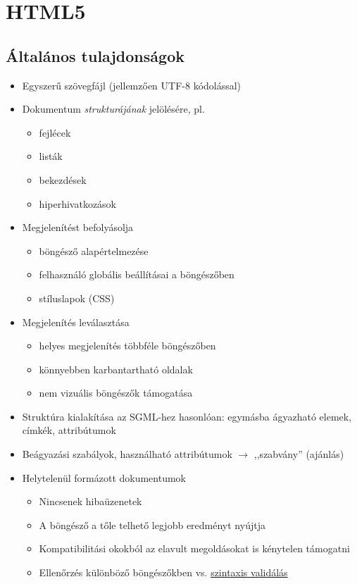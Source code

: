 \documentclass[usenames,dvipsnames,aspectratio=169]{beamer}
\newcommand{\hiv}[1]{{\color{hivatkozasszin}#1}}
\begin{document}
\section{HTML5}

\subsection{Általános tulajdonságok}

\begin{frame}
  \begin{itemize}
    \item Egyszerű szövegfájl (jellemzően UTF-8 kódolással)
    \item Dokumentum \emph{strukturájának} jelölésére, pl.
    \begin{itemize}
      \item fejlécek
      \item listák
      \item bekezdések
      \item hiperhivatkozások
    \end{itemize}
    \item Megjelenítést befolyásolja
    \begin{itemize}
      \item böngésző alapértelmezése
      \item felhasználó globális beállításai a böngészőben
      \item stíluslapok (CSS)
    \end{itemize}
    \item Megjelenítés leválasztása
    \begin{itemize}
      \item helyes megjelenítés többféle böngészőben
      \item könnyebben karbantartható oldalak
      \item nem vizuális böngészők támogatása
    \end{itemize}
  \end{itemize}
\end{frame}

\begin{frame}
  \begin{itemize}
    \item Struktúra kialakítása az SGML-hez hasonlóan: egymásba ágyazható elemek, címkék, attribútumok
    \item Beágyazási szabályok, használható attribútumok $\to$ ,,szabvány'' (ajánlás)
    \item Helytelenül formázott dokumentumok
    \begin{itemize}
      \item Nincsenek hibaüzenetek
      \item A böngésző a tőle telhető legjobb eredményt nyújtja
      \item Kompatibilitási okokból az elavult megoldásokat is kénytelen támogatni
      \item Ellenőrzés különböző böngészőkben vs. \hiv{\href{https://validator.w3.org/}{szintaxis validálás}}
    \end{itemize}
  \end{itemize}
\end{frame}
\end{document}
